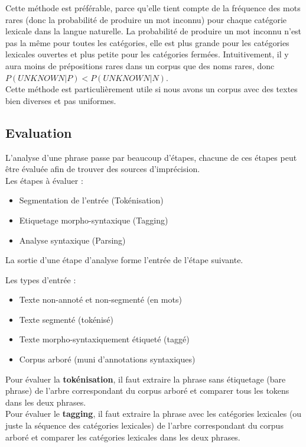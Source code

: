 \documentclass[12pt]{article}
\begin{document}
Cette méthode est préférable, parce qu'elle tient compte de la
fréquence des mots rares (donc la probabilité de produire un mot inconnu) pour
chaque catégorie lexicale dans la langue naturelle. La probabilité
de produire un mot inconnu n'est pas la même pour toutes les
catégories, elle est plus grande pour les catégories lexicales ouvertes et plus
petite pour les catégories fermées.
Intuitivement, il y aura moins de prépositions rares dans un corpus que des noms rares, donc $P(UNKNOWN|P) < P(UNKNOWN|N)$.
\\

Cette méthode est particulièrement utile si nous avons un corpus avec des
textes bien diverses et pas uniformes. 

\subsection{Evaluation}

L'analyse d'une phrase passe par beaucoup d'étapes, chacune de ces étapes peut
être évaluée afin de trouver des sources d'imprécision.\\

Les étapes à évaluer :
\begin{itemize}
\item Segmentation de l'entrée (Tokénisation)
\item Etiquetage morpho-syntaxique (Tagging)
\item Analyse syntaxique (Parsing)
\end{itemize}


La sortie d'une étape d'analyse forme l'entrée de l'étape suivante. 

Les types d'entrée :
\begin{itemize}
\item Texte non-annoté et non-segmenté (en mots)
\item Texte segmenté (tokénisé)
\item Texte morpho-syntaxiquement étiqueté (taggé)
\item Corpus arboré (muni d'annotations syntaxiques)
\end{itemize}

Pour évaluer la \textbf{tokénisation}, il faut extraire la phrase sans
étiquetage (bare phrase) de l'arbre correspondant du corpus arboré et comparer
tous les tokens dans les deux phrases. \\

Pour évaluer le \textbf{tagging}, il faut extraire la phrase avec les catégories
lexicales (ou juste la séquence des catégories lexicales) de l'arbre
correspondant du corpus arboré et comparer les catégories lexicales dans les
deux phrases.\\
\end{document}
